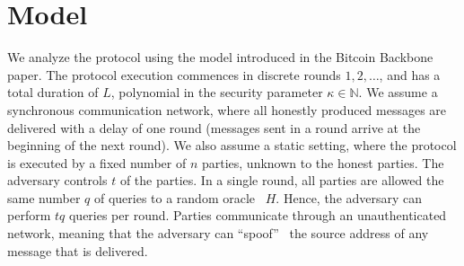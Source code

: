 \section{Model}

We analyze the protocol using the model introduced in the Bitcoin Backbone~\cite{backbone} paper.
The protocol execution commences in discrete rounds $1, 2, \ldots$, and has a total duration of
$L$, polynomial in the security parameter $\kappa \in \mathbb{N}$.
We assume a synchronous communication network, where all honestly produced
messages are delivered with a delay of one round (messages sent in a round
arrive at the beginning of the next round).
We also assume a static setting, where the protocol is executed by
a fixed number of $n$ parties, unknown to the honest parties.
The adversary controls $t$ of the parties.
In a single round, all parties are allowed the same number $q$ of queries to
a random oracle~\cite{ro} $H$. Hence, the adversary can perform $t q$ queries
per round.
Parties communicate through an unauthenticated network,
meaning that the adversary can ``spoof''~\cite{douceur2002sybil}
the source address of any message that is delivered.
